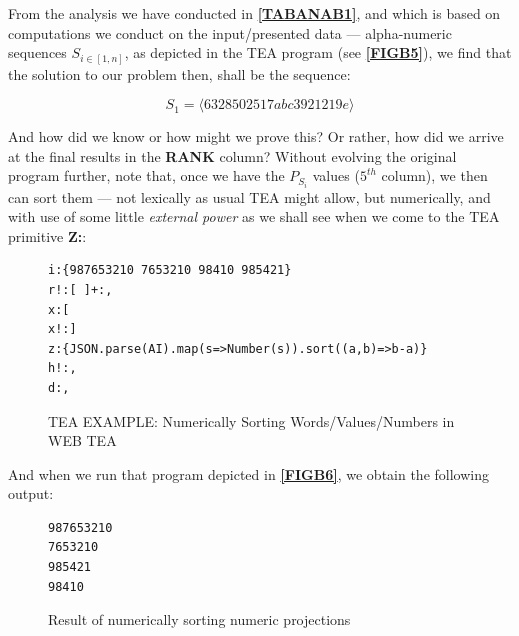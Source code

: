 \documentclass[a4paper, 18pt]{book} %
\begin{document}
From the analysis we have conducted in \textbf{\autoref{TABANAB1}}, and which is based on computations we conduct on the input/presented data --- alpha-numeric sequences $S_{i\in [1,n]}$, as depicted in the TEA program (see  \textbf{\autoref{FIGB5}}), we find that the solution to our problem then, shall be the sequence:

\begin{equation}
\label{EQB1}
S_1 = \langle 63 285 02517 abc3921 219e \rangle
\end{equation}

And how did we know or how might we prove this? Or rather, how did we arrive at the final results in the \textbf{RANK} column? Without evolving the original program further, note that, once we have the $P_{S_i}$ values ($5^{th}$ column), we then can sort them --- not lexically as usual TEA might allow, but numerically, and with use of some little \textit{external power} as we shall see when we come to the TEA primitive \textbf{Z:}:



 \begin{figure}[H]
 \Large
  \centering
  \begin{tcolorbox}[teaterminalstyle, title=TEA Program: sort in descending order numbers from input sequence]
  \begin{lstlisting}[language=TEA]
i:{987653210 7653210 98410 985421} 
r!:[ ]+:,
x:[
x!:]
z:{JSON.parse(AI).map(s=>Number(s)).sort((a,b)=>b-a)}
h!:,
d:,
   \end{lstlisting}
  \end{tcolorbox}
  \caption{TEA EXAMPLE: Numerically Sorting Words/Values/Numbers in WEB TEA}
  \label{FIGB6}
\end{figure}


And when we run that program depicted in \textbf{\autoref{FIGB6}}, we obtain the following output:


\begin{figure}[H]
  \centering
  \begin{tcolorbox}[myterminalstyle, title=TEA Output from \textbf{\autoref{FIGB6}}]
  \begin{lstlisting}
987653210
7653210
985421
98410
  \end{lstlisting}
  \end{tcolorbox}
  \caption{Result of numerically sorting numeric projections}
\end{figure}
\end{document}
